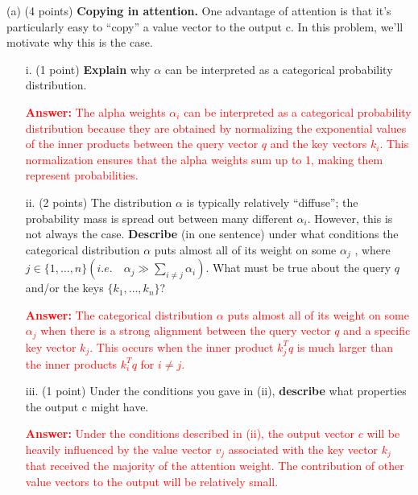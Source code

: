 \documentclass[letterpaper,12pt]{article}
\begin{document}
	\noindent(a) (4 points) \textbf{Copying in attention.} One advantage of attention is that it’s particularly easy to “copy” a value vector to the output c. In this problem, we’ll motivate why this is the case.
		
		\begin{itemize}
			\item [i.]
			(1 point) \textbf{Explain} why $\alpha$ can be interpreted as a categorical probability distribution.
			
			\textcolor{red}{\textbf{Answer:} The alpha weights $\alpha_i$ can be interpreted as a categorical probability distribution because they are obtained by normalizing the exponential values of the inner products between the query vector $q$ and the key vectors $k_i$. This normalization ensures that the alpha weights sum up to 1, making them represent probabilities.}
		\end{itemize}
	
		\begin{itemize}
			\item [ii.]
			(2 points) The distribution $\alpha$ is typically relatively “diffuse”; the probability mass is spread out between many different $\alpha_i$. However, this is not always the case. \textbf{Describe} (in one sentence) under what conditions the categorical distribution $\alpha$ puts almost all of its weight on some $\alpha_j$ , where $j \in \{1, \ldots , n\} (i.e. \quad \alpha_j \gg \sum_{i\neq j} \alpha_i)$. What must be true about the query $q$ and/or the keys $\{k_1, \ldots , k_n\}$?
			
			\textcolor{red}{\textbf{Answer:} The categorical distribution $\alpha$ puts almost all of its weight on some $\alpha_j$ when there is a strong alignment between the query vector $q$ and a specific key vector $k_j$. This occurs when the inner product $k_j^Tq$ is much larger than the inner products $k_i^Tq$ for $i\neq j$.}
		\end{itemize}

		\begin{itemize}
			\item [iii.]
			(1 point) Under the conditions you gave in (ii), \textbf{describe} what properties the output c might have.
			
			\textcolor{red}{\textbf{Answer:} Under the conditions described in (ii), the output vector $c$ will be heavily influenced by the value vector $v_j$ associated with the key vector $k_j$ that received the majority of the attention weight. The contribution of other value vectors to the output will be relatively small.}
		\end{itemize}
\end{document}
